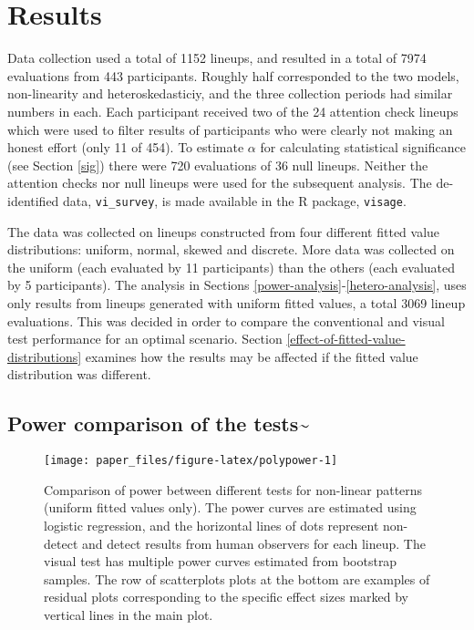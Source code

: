 \documentclass[]{interact}
\theoremstyle{plain}%
\theoremstyle{definition}
\theoremstyle{remark}
\begin{document}
\hypertarget{results}{%
\section{Results}\label{results}}

Data collection used a total of 1152 lineups, and resulted in a total of
7974 evaluations from 443 participants. Roughly half corresponded to the
two models, non-linearity and heteroskedasticiy, and the three
collection periods had similar numbers in each. Each participant
received two of the 24 attention check lineups which were used to filter
results of participants who were clearly not making an honest effort
(only 11 of 454). To estimate \(\alpha\) for calculating statistical
significance (see Section \ref{sig}) there were 720 evaluations of 36
null lineups. Neither the attention checks nor null lineups were used
for the subsequent analysis. The de-identified data,
\texttt{vi\_survey}, is made available in the R package,
\texttt{visage}.

The data was collected on lineups constructed from four different fitted
value distributions: uniform, normal, skewed and discrete. More data was
collected on the uniform (each evaluated by 11 participants) than the
others (each evaluated by 5 participants). The analysis in Sections
\ref{power-analysis}-\ref{hetero-analysis}, uses only results from
lineups generated with uniform fitted values, a total 3069 lineup
evaluations. This was decided in order to compare the conventional and
visual test performance for an optimal scenario. Section
\ref{effect-of-fitted-value-distributions} examines how the results may
be affected if the fitted value distribution was different.

\hypertarget{power-comparison-of-the-tests}{%
\subsection{\texorpdfstring{Power comparison of the
tests\textasciitilde{}\label{power-analysis}}{Power comparison of the tests\textasciitilde{}}}\label{power-comparison-of-the-tests}}

\begin{figure}

{\centering \texttt{[image: paper\_files/figure-latex/polypower-1]} 

}

\caption{Comparison of power between different tests for non-linear patterns (uniform fitted values only). The power curves are estimated using logistic regression, and the horizontal lines of dots represent non-detect and detect results from human observers for each lineup. The visual test has multiple power curves estimated from bootstrap samples. The row of scatterplots plots at the bottom are examples of residual plots corresponding to the specific effect sizes marked by vertical lines in the main plot.}\label{fig:polypower}
\end{figure}
\end{document}
